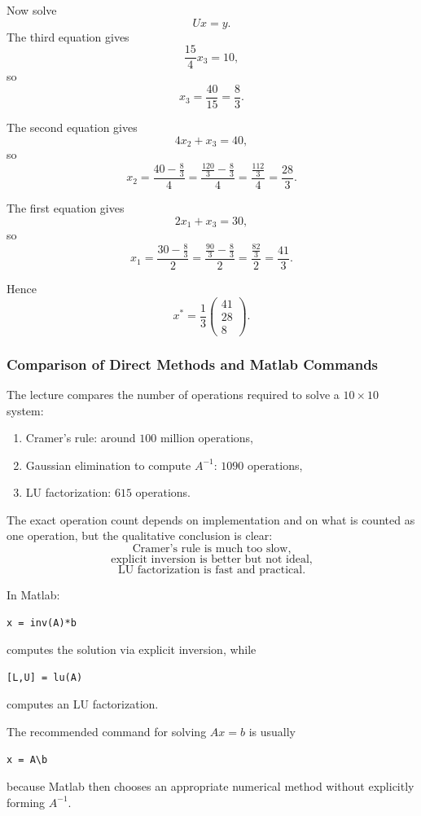 \documentclass[10pt, letterpaper]{article}
\begin{document}
Now solve
\[
Ux=y.
\]
The third equation gives
\[
\frac{15}{4}x_3=10,
\]
so
\[
x_3=\frac{40}{15}=\frac{8}{3}.
\]

The second equation gives
\[
4x_2+x_3=40,
\]
so
\[
x_2
=
\frac{40-\frac83}{4}
=
\frac{\frac{120}{3}-\frac83}{4}
=
\frac{\frac{112}{3}}{4}
=
\frac{28}{3}.
\]

The first equation gives
\[
2x_1+x_3=30,
\]
so
\[
x_1
=
\frac{30-\frac83}{2}
=
\frac{\frac{90}{3}-\frac83}{2}
=
\frac{\frac{82}{3}}{2}
=
\frac{41}{3}.
\]

Hence
\[
x^\ast
=
\frac13
\begin{pmatrix}
41\\
28\\
8
\end{pmatrix}.
\]

\subsubsection{Comparison of Direct Methods and Matlab Commands}

The lecture compares the number of operations required to solve a \(10\times 10\) system:
\begin{enumerate}
    \item Cramer's rule: around \(100\) million operations,
    \item Gaussian elimination to compute \(A^{-1}\): \(1090\) operations,
    \item LU factorization: \(615\) operations.
\end{enumerate}

The exact operation count depends on implementation and on what is counted as one operation, but the qualitative conclusion is clear:
\[
\text{Cramer's rule is much too slow,}
\]
\[
\text{explicit inversion is better but not ideal,}
\]
\[
\text{LU factorization is fast and practical.}
\]

In Matlab:
\begin{verbatim}
x = inv(A)*b
\end{verbatim}
computes the solution via explicit inversion, while
\begin{verbatim}
[L,U] = lu(A)
\end{verbatim}
computes an LU factorization.

The recommended command for solving \(Ax=b\) is usually
\begin{verbatim}
x = A\b
\end{verbatim}
because Matlab then chooses an appropriate numerical method without explicitly forming \(A^{-1}\).
\end{document}
